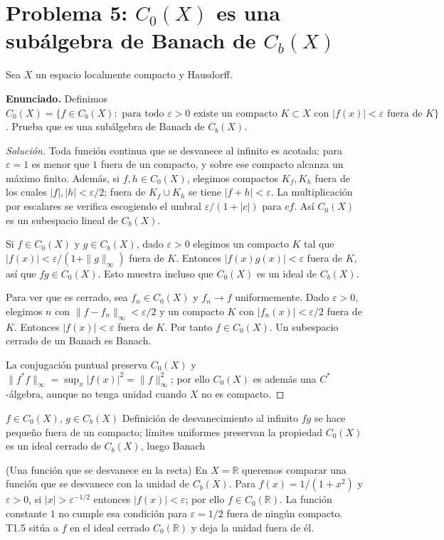 \section{Problema 5: $C_0(X)$ es una subálgebra de Banach de $C_b(X)$}

Sea $X$ un espacio localmente compacto y Hausdorff.

\noindent\textbf{Enunciado.} Definimos $C_0(X)=\{f\in C_b(X):\text{ para todo }\varepsilon>0\text{ existe un compacto }K\subset X\text{ con }|f(x)|<\varepsilon\text{ fuera de }K\}$. Prueba que es una subálgebra de Banach de $C_b(X)$.

\begin{proof}[Solución]
Toda función continua que se desvanece al infinito es acotada: para $\varepsilon=1$ es menor
que $1$ fuera de un compacto, y sobre ese compacto alcanza un máximo finito.
Además, si $f,h\in C_0(X)$, elegimos compactos $K_f,K_h$ fuera de los cuales
$|f|,|h|<\varepsilon/2$; fuera de $K_f\cup K_h$ se tiene $|f+h|<\varepsilon$.
La multiplicación por escalares se verifica escogiendo el umbral
$\varepsilon/(1+|c|)$ para $cf$. Así $C_0(X)$ es un subespacio lineal de $C_b(X)$.

Si $f\in C_0(X)$ y $g\in C_b(X)$, dado $\varepsilon>0$ elegimos un compacto $K$ tal que
$|f(x)|<\varepsilon/(1+\|g\|_\infty)$ fuera de $K$. Entonces
$|f(x)g(x)|<\varepsilon$ fuera de $K$, así que $fg\in C_0(X)$. Esto muestra incluso que $C_0(X)$
es un ideal de $C_b(X)$.

Para ver que es cerrado, sea $f_n\in C_0(X)$ y $f_n\to f$ uniformemente. Dado $\varepsilon>0$,
elegimos $n$ con $\|f-f_n\|_\infty<\varepsilon/2$ y un compacto $K$ con
$|f_n(x)|<\varepsilon/2$ fuera de $K$. Entonces $|f(x)|<\varepsilon$ fuera de $K$.
Por tanto $f\in C_0(X)$. Un subespacio cerrado de un Banach es Banach.

La conjugación puntual preserva $C_0(X)$ y
$\|f^*f\|_\infty=\sup_x|f(x)|^2=\|f\|_\infty^2$; por ello $C_0(X)$ es además una
$C^*$-álgebra, aunque no tenga unidad cuando $X$ no es compacto.
\end{proof}

\proofdiagram
{$f\in C_0(X)$, $g\in C_b(X)$}
{Definición de desvanecimiento al infinito}
{$fg$ se hace pequeño fuera de un compacto; límites uniformes preservan la propiedad}
{$C_0(X)$ es un ideal cerrado de $C_b(X)$, luego Banach}

\begin{cthejemplo}{(Una función que se desvanece en la recta)}
En $X=\mathbb R$ queremos comparar una función que se desvanece con la unidad de $C_b(X)$.
Para $f(x)=1/(1+x^2)$ y $\varepsilon>0$, si $|x|>\varepsilon^{-1/2}$ entonces
$|f(x)|<\varepsilon$; por ello $f\in C_0(\mathbb R)$.
La función constante $1$ no cumple esa condición para $\varepsilon=1/2$ fuera de ningún
compacto. T1.5 sitúa a $f$ en el ideal cerrado $C_0(\mathbb R)$ y deja la unidad fuera de él.
\end{cthejemplo}

